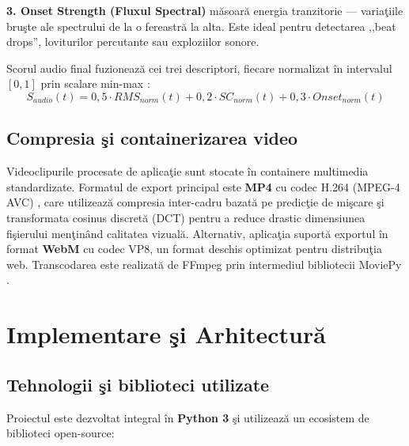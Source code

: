 \documentclass[12pt,a4paper]{article}
\begin{document}
\textbf{3. Onset Strength (Fluxul Spectral)} m\u{a}soar\u{a}{} energia tranzitorie --- varia\c{t}iile bru\c{s}te ale spectrului de la o fereastr\u{a}{} la alta. Este ideal pentru detectarea ,,beat drops'', loviturilor percutante sau exploziilor sonore.

Scorul audio final fuzioneaz\u{a}{} cei trei descriptori, fiecare normalizat \^{i}n intervalul $[0, 1]$ prin scalare min-max \cite{muller2016}:
\begin{equation}
    S_{audio}(t) = 0{,}5 \cdot RMS_{norm}(t) + 0{,}2 \cdot SC_{norm}(t) + 0{,}3 \cdot Onset_{norm}(t)
\end{equation}

\subsection{Compresia \c{s}i containerizarea video}

Videoclipurile procesate de aplica\c{t}ie sunt stocate \^{i}n containere multimedia standardizate. Formatul de export principal este \textbf{MP4} cu codec H.264 (MPEG-4 AVC) \cite{itu2003}, care utilizeaz\u{a}{} compresia inter-cadru bazat\u{a}{} pe predic\c{t}ie de mi\c{s}care \c{s}i transformata cosinus discret\u{a}{} (DCT) pentru a reduce drastic dimensiunea fi\c{s}ierului men\c{t}in\^{a}nd calitatea vizual\u{a}. Alternativ, aplica\c{t}ia suport\u{a}{} exportul \^{i}n format \textbf{WebM} cu codec VP8, un format deschis optimizat pentru distribu\c{t}ia web. Transcodarea este realizat\u{a}{} de FFmpeg prin intermediul bibliotecii MoviePy \cite{moviepy2015}.

\section{Implementare \c{s}i Arhitectur\u{a}}

\subsection{Tehnologii \c{s}i biblioteci utilizate}

Proiectul este dezvoltat integral \^{i}n \textbf{Python 3} \c{s}i utilizeaz\u{a}{} un ecosistem de biblioteci open-source:
\end{document}
